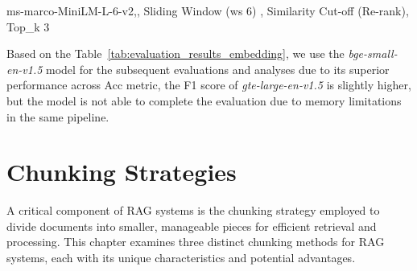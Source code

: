 \begin{table}[h!]
    \centering
    \noindent
    {\scriptsize ms-marco-MiniLM-L-6-v2,, Sliding Window (ws 6) , Similarity Cut-off (Re-rank), Top\_k 3}
    \caption{Evaluation Results for Different Embedding Models through the Pipeline (just with the Gemma2 model)}
    \label{tab:evaluation_results_embedding}
\end{table}

Based on the Table~\ref{tab:evaluation_results_embedding}, we use the \textit{bge-small-en-v1.5} model for the subsequent evaluations and analyses due to its superior performance across Acc metric, the F1 score of \textit{gte-large-en-v1.5} is slightly higher, but the model is not able to complete the evaluation due to memory limitations in the same pipeline.

\section{Chunking Strategies}\label{sec:chunking-strategies}
A critical component of \ac{RAG} systems is the chunking strategy employed to divide documents into smaller, manageable pieces for efficient retrieval and processing.
This chapter examines three distinct chunking methods for \ac{RAG} systems, each with its unique characteristics and potential advantages.

